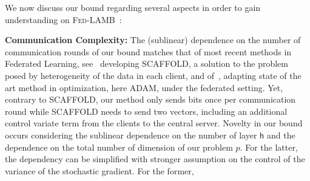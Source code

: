 \documentclass[11pt]{article}
\newtheorem{Corollary}{Corollary}
\newtheorem{assumption}{H\!\!}
\newcommand{\beq}{\begin{equation}}
\newcommand{\eeq}{\end{equation}}
\def\EE{\mathbb{E}}
\def\tot{\mathsf{h}}
\newcommand{\algo}{\textsc{Fed-LAMB}}
\begin{document}





We now discuss our bound regarding several aspects in order to gain understanding on \algo\ :

\medskip
\textbf{Communication Complexity:} The (sublinear) dependence on the number of communication rounds of our bound matches that of most recent methods in Federated Learning, see~\cite{karimireddy2019scaffold} developing SCAFFOLD, a solution to the problem posed by heterogeneity of the data in each client, and of~\cite{reddi2020adaptive}, adapting state of the art method in optimization, here ADAM, under the federated setting. 
Yet, contrary to SCAFFOLD, our method only sends bits once per communication round while SCAFFOLD needs to send two vectors, including an additional control variate term  from the clients to the central server.
Novelty in our bound occurs considering the sublinear dependence on the number of layer $\tot$ and the dependence on the total number of dimension of our problem $p$. For the latter, the dependency can be simplified with stronger assumption on the control of the variance of the stochastic gradient. For the former, 
\end{document}
